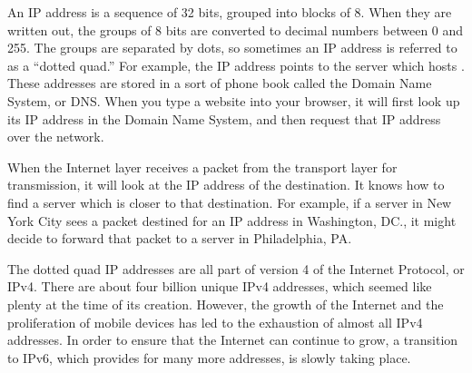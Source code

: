 An IP address is a sequence of 32 bits, grouped into blocks of 8. When they are written out, the groups of 8 bits are converted to decimal numbers between 0 and 255. The groups are separated by dots, so sometimes an IP address is referred to as a ``dotted quad.'' For example, the IP address  points to the server which hosts . These addresses are stored in a sort of phone book called the Domain Name System, or DNS. When you type a website into your browser, it will first look up its IP address in the Domain Name System, and then request that IP address over the network.

When the Internet layer receives a packet from the transport layer for transmission, it will look at the IP address of the destination. It knows how to find a server which is closer to that destination. For example, if a server in New York City sees a packet destined for an IP address in Washington, DC., it might decide to forward that packet to a server in Philadelphia, PA.



The dotted quad IP addresses are all part of version 4 of the Internet Protocol, or IPv4. There are about four billion unique IPv4 addresses, which seemed like plenty at the time of its creation. However, the growth of the Internet and the proliferation of mobile devices has led to the exhaustion of almost all IPv4 addresses. In order to ensure that the Internet can continue to grow, a transition to IPv6, which provides for many more addresses, is slowly taking place.

